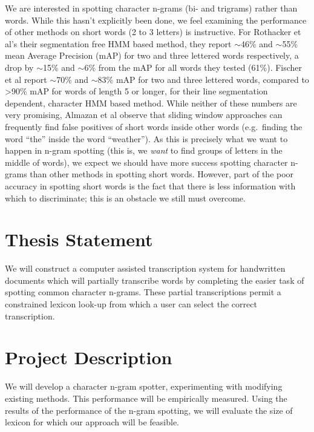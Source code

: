 \documentclass[ms]{byuprop}
\begin{document}
We are interested in spotting character n-grams (bi- and trigrams) rather than words. While this hasn't explicitly been done, we feel examining the performance of other methods on short words (2 to 3 letters) is instructive. For Rothacker et al's\cite{Rothacker2013} their segmentation free HMM based method, they report $\sim$46\% and $\sim$55\% mean Average Precision (mAP) for two and three lettered words respectively, a drop by $\sim$15\% and $\sim$6\% from the mAP for all words they tested (61\%). Fischer et al\cite{Fischer2012} report $\sim$70\% and $\sim$83\% mAP for two and three lettered words, compared to {\textgreater}90\% mAP for words of length 5 or longer, for their line segmentation dependent, character HMM based method. While neither of these numbers are very promising, Almazan et al\cite{Almazan2012} observe that sliding window approaches can frequently find false positives of short words inside other words (e.g.~finding the word ``the'' inside the word ``weather''). As this is precisely what we want to happen in n-gram spotting (this is, we \textit{want} to find groups of letters in the middle of words), we expect we should have more success spotting character n-grams than other methods in spotting short words. However, part of the poor accuracy in spotting short words is the fact that there is less information with which to discriminate; this is an obstacle we still must overcome.


\section{Thesis Statement}


We will construct a computer assisted transcription system for handwritten documents which will partially transcribe words by completing the easier task of spotting common character n-grams. These partial transcriptions permit a constrained lexicon look-up from which a user can select the correct transcription. 

\section{Project Description}

We will develop a character n-gram spotter, experimenting with modifying existing methods.
This performance will be empirically measured. Using the results of the performance of the n-gram spotting, we will evaluate the size of lexicon for which our approach will be feasible.
\end{document}
